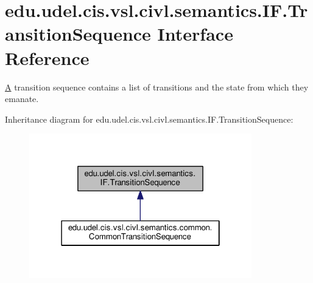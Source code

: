 \hypertarget{interfaceedu_1_1udel_1_1cis_1_1vsl_1_1civl_1_1semantics_1_1IF_1_1TransitionSequence}{}\section{edu.\+udel.\+cis.\+vsl.\+civl.\+semantics.\+I\+F.\+Transition\+Sequence Interface Reference}
\label{interfaceedu_1_1udel_1_1cis_1_1vsl_1_1civl_1_1semantics_1_1IF_1_1TransitionSequence}


\hyperlink{structA}{A} transition sequence contains a list of transitions and the state from which they emanate.  




Inheritance diagram for edu.\+udel.\+cis.\+vsl.\+civl.\+semantics.\+I\+F.\+Transition\+Sequence\+:
\nopagebreak
\begin{figure}[H]
\begin{center}
\leavevmode
\includegraphics[width=274pt]{interfaceedu_1_1udel_1_1cis_1_1vsl_1_1civl_1_1semantics_1_1IF_1_1TransitionSequence__inherit__graph}
\end{center}
\end{figure}
